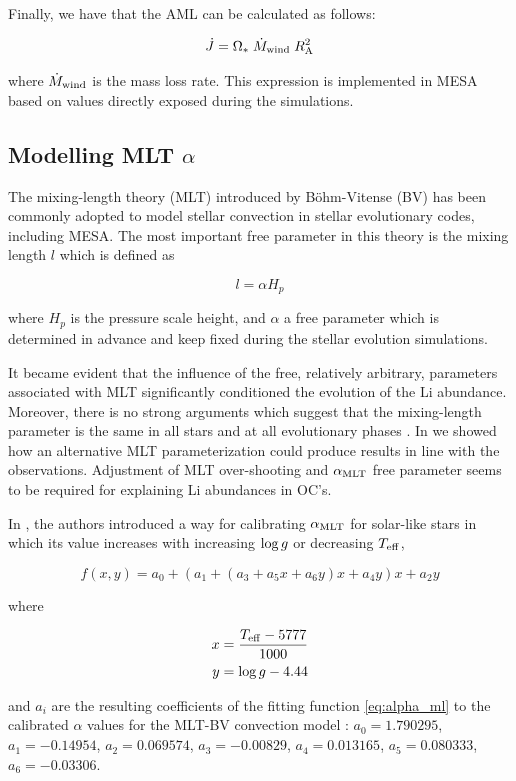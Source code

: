 \documentclass[fleqn,usenatbib]{mnras}
\begin{document}
Finally, we have that the AML can be calculated as follows:
\begin{ceqn}
\begin{equation}
 \Dot{J} = \Omega_* \; \Dot{M}_{\mathrm{wind}} \; R_{\mathrm{A}}^{2} \label{eq:j_dot}
\end{equation}
\end{ceqn}
where $\Dot{M}_{\mathrm{wind}}$ is the mass loss rate. This expression is implemented in MESA based on values directly exposed during the simulations.

\subsection{Modelling MLT $\alpha$} \label{mod_mltalpha}
The mixing-length theory (MLT) introduced by Böhm-Vitense (BV) has been commonly adopted to model stellar convection in stellar evolutionary codes, including MESA. The most important free parameter in this theory is the mixing length $l$ which is defined as 
\begin{ceqn}
\begin{equation}
 l = \alpha H_p\label{eq:mixlength}
\end{equation}
\end{ceqn}
where $H_p$ is the pressure scale height, and $\alpha$ a free parameter which is determined in advance and keep fixed during the stellar evolution simulations.\par

 It became evident that the influence of the free, relatively arbitrary, parameters associated with MLT significantly conditioned the evolution of the Li abundance. Moreover, there is no strong arguments which suggest that the mixing-length parameter is the same in all stars and at all evolutionary phases \citep{Pasetto2014}. In \cite{Navarro2020} we showed how an alternative MLT parameterization could produce results in line with the observations. Adjustment of MLT over-shooting and $\alpha_{\mathrm{MLT}}$ free parameter seems to be required for explaining Li abundances in OC's.\par

In \cite{Sonoi2018}, the authors introduced a way for calibrating $\alpha_{\mathrm{MLT}}$ for solar-like stars in which its value increases with increasing $\mathrm{log} \, g$ or decreasing $T_{\mathrm{eff}}$,

\begin{ceqn}
\begin{equation}
 f(x,y) = a_0 + (a_1 + (a_3 + a_5x +a_6y)x + a_4y)x + a_2y\label{eq:alpha_ml}
\end{equation}
\end{ceqn}
where
\begin{ceqn}
\begin{align}
     x &= \frac{T_{\mathrm{eff}}-5777}{1000} \label{eq:eq:alpha_x}\\
     y &= \mathrm{log} \, g-4.44 \label{eq:eq:alpha_y}
\end{align}
\end{ceqn}
and $a_i$ are the resulting coefficients of the fitting function \ref{eq:alpha_ml} to the calibrated $\alpha$ values for the MLT-BV convection model \citep{Sonoi2018}: $a_0=1.790295$, $a_1=-0.14954$, $a_2=0.069574$, $a_3=-0.00829$, $a_4=0.013165$, $a_5=0.080333$, $a_6=-0.03306$.\par
\end{document}
